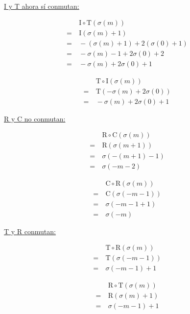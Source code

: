 		 \underline{I y T ahora sí conmutan:}
		 \vspace*{-2\bigskipamount}
		\begin{multicols}{2}
			\begin{align*}
			&\ \text{I}\circ\text{T}(\sigma(m))\\
			=&\ \text{I}(\sigma(m)+1)\\
			=&\ -(\sigma(m)+1) + 2(\sigma(0)+1)\\
			=&\ -\sigma(m)-1+2\sigma(0)+2\\
			=&\ -\sigma(m)+2\sigma(0)+1
			\end{align*}
			
			\begin{align*}
			&\ \text{T}\circ\text{I}(\sigma(m))\\
			=&\ \text{T}(-\sigma(m)+2\sigma(0))\\
			=&\ -\sigma(m)+2\sigma(0)+1
			\end{align*}
		\end{multicols}
		
		 \underline{R y C no conmutan:}
		 \vspace*{-2\bigskipamount}
		\begin{multicols}{2}
		\begin{align*}
		&\ \text{R}\circ\text{C}(\sigma(m))\\
		=&\ \text{R}(\sigma(m+1))\\
		=&\ \sigma(-(m+1)-1)\\
		=&\ \sigma(-m-2)
		\end{align*}
		
		\begin{align*}
		&\ \text{C}\circ\text{R}(\sigma(m))\\
		=&\ \text{C}(\sigma(-m-1))\\
		=&\ \sigma(-m-1+1)\\
		=&\ \sigma(-m)
		\end{align*}
		\end{multicols}
		
		 \underline{T y R conmutan:}
		 \vspace*{-2\bigskipamount}
		\begin{multicols}{2}
			\begin{align*}
			&\ \text{T}\circ\text{R}(\sigma(m))\\
			=&\ \text{T}(\sigma(-m-1))\\
			=&\ \sigma(-m-1)+1
			\end{align*}
			
			\begin{align*}
			&\ \text{R}\circ\text{T}(\sigma(m))\\
			=&\ \text{R}(\sigma(m)+1)\\
			=&\ \sigma(-m-1)+1
			\end{align*}
		\end{multicols}
	
